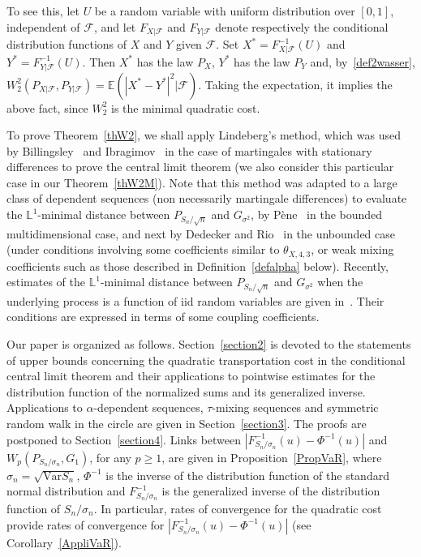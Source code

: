\documentclass[AHL,Unicode,longabstracts,published]{cedram}
\newcommand{\bbE}{\mathbb{E}}
\newcommand{\clF}{\mathcal{F}}
\newcommand{\bbL}{\mathbb{L}}
\newcommand{\Var}{\mathrm{Var}}
\begin{document}
To see this, let $U$ be a random variable with uniform distribution over $[0,1]$, independent of $\clF$, and let $F_{ X| \clF }$ and $F_{ Y| \clF }$ denote respectively the conditional distribution functions of $X$ and $Y$ given $\clF$. Set $X^* = F_{ X| \clF }^{-1} (U)$ and $Y^* = F_{Y| \clF }^{-1} (U)$. Then $X^*$ has the law $P_X$, $Y^*$ has the law $P_Y$ and, by~\eqref{def2wasser}, $W_2^2 (P_{X | \clF}, P_{Y | \clF}) = \bbE (|X^* - Y^*|^2 | \clF)$. Taking the expectation, it implies the above fact, since $W_2^2$ is the minimal quadratic cost.



To prove Theorem~\ref{thW2}, we shall apply Lindeberg's method, which was used by Billingsley~\cite{Bil61} and Ibragimov~\cite{Ibr63} in the case of martingales with stationary differences to prove the central limit theorem (we also consider this particular case in our Theorem~\ref{thW2M}). Note that this method was adapted to a large class of dependent sequences (non necessarily martingale differences) to evaluate the $\bbL^1$-minimal distance between $P_{S_n / {\sqrt n}}$ and $G_{\sigma^2}$, by Pène~\cite{Pe05} in the bounded multidimensional case, and next by Dedecker and Rio~\cite{DR08} in the unbounded case (under conditions involving some coefficients similar to $\theta_{X,4,3}$, or weak mixing coefficients such as those described in Definition~\ref{defalpha} below). Recently, estimates of the $\bbL^1$-minimal distance between $P_{S_n / {\sqrt n}}$ and $G_{\sigma^2}$ when the underlying process is a function of iid random variables are given in~\cite[Theorem~3.1]{JWZ}. Their conditions are expressed in terms of some coupling coefficients.



Our paper is organized as follows. Section~\ref{section2} is devoted to the statements of upper bounds concerning the quadratic transportation cost in the conditional central limit theorem and their applications to pointwise estimates for the distribution function of the normalized sums and its generalized inverse. Applications to $\alpha$-dependent sequences, $\tau$-mixing sequences and symmetric random walk in the circle are given in Section~\ref{section3}. The proofs are postponed to Section~\ref{section4}. Links between $ | F_{S_n/\sigma_n}^{-1}(u) - \Phi^{-1} (u) | $ and $W_p (P_{S_n / \sigma_n}, G_1)$, for any $p \geq 1$, are given in Proposition~\ref{PropVaR}, where $\sigma_n = \sqrt{ \Var S_n}$, $\Phi^{-1}$ is the inverse of the distribution function of the standard normal distribution and $F_{S_n/\sigma_n}^{-1}$ is the generalized inverse of the distribution function of $S_n/\sigma_n$. In particular, rates of convergence for the quadratic cost provide rates of convergence for $ | F_{S_n/\sigma_n}^{-1}(u) - \Phi^{-1} (u) | $ (see Corollary~\ref{AppliVaR}).
\end{document}
